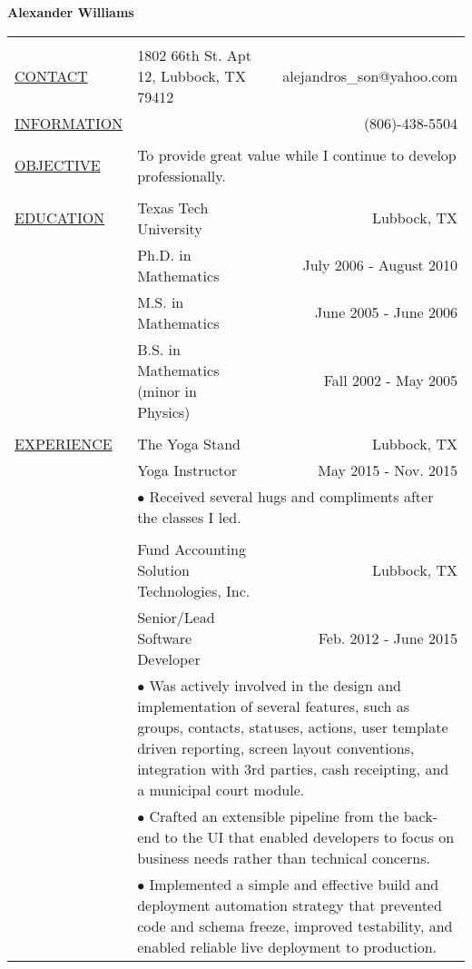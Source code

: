 \documentclass[11pt,oneside,letterpaper,titlepage,fleqn]{article}
\begin{document}
\noindent\LARGE{\textbf{Alexander Williams}}\normalsize{}\\
\hspace{-1em}\begin{tabular}[h]{@{}p{3.25cm}@{}lr}
\hline\\
\underline{CONTACT} & 1802 66th St. Apt 12, Lubbock, TX 79412 & alejandros\_son@yahoo.com \\
\underline{INFORMATION} &  & (806)-438-5504\\
\\
\underline{OBJECTIVE} &  \multicolumn{2}{p{14cm}}{To provide great value while I continue to develop professionally.}\\
\\
\underline{EDUCATION} & Texas Tech University & Lubbock, TX\\
           & Ph.D. in Mathematics & July 2006 - August 2010\\            
           & M.S. in Mathematics  & June 2005 - June 2006\\                       
           & B.S. in Mathematics (minor in Physics) & Fall 2002 - May 2005\\
\\
\underline{EXPERIENCE} & The Yoga Stand & Lubbock, TX\\
           & Yoga Instructor & May 2015 - Nov. 2015\\
           & \multicolumn{2}{p{14cm}}{$\bullet$ Received several hugs and compliments after the classes I led.}\\
\\					
& Fund Accounting Solution Technologies, Inc. & Lubbock, TX\\
           & Senior/Lead Software Developer & Feb. 2012 - June 2015\\
           & \multicolumn{2}{p{14cm}}{$\bullet$ Was actively involved in the design and implementation of several features, such as groups,
 contacts, statuses, actions, user template driven reporting, screen layout conventions,
integration with 3rd parties, cash receipting, and a municipal court module.}\\
           & \multicolumn{2}{p{14cm}}{$\bullet$ Crafted an extensible pipeline from the back-end to the UI that enabled developers to
 focus on business needs rather than technical concerns.}\\
           & \multicolumn{2}{p{14cm}}{$\bullet$ Implemented a simple and effective build and deployment automation strategy that prevented
 code and schema freeze, improved testability, and enabled reliable live deployment to production.}\\

\end{tabular}
\end{document}
